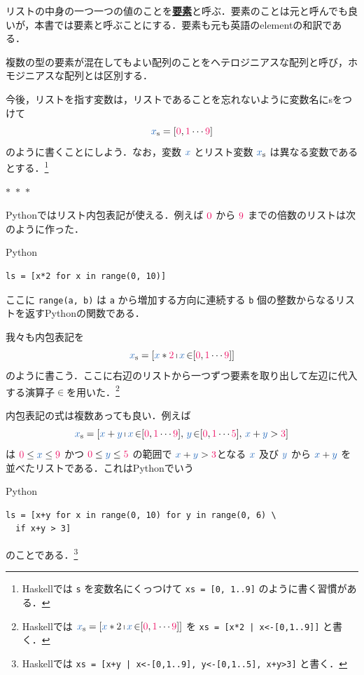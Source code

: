 \documentclass[a5paper,twoside,fleqn,draft]{jsbook}
\def\constantColor{WildStrawberry}
\def\varColor{NavyBlue}
\newcommand{\separator}{\begin{center}$*$~$*$~$*$\end{center}}
\newcommand{\programminglanguage}[1]{\textsf{#1}}
\newcommand{\haskell}{\programminglanguage{Haskell}}
\newcommand{\python}{\programminglanguage{Python}}
\newcommand{\keyword}[1]{{\underline{\textbf{#1}}}}
\newcommand{\code}[1]{\texttt{#1}}
\newenvironment{pythoncode}{\begin{itembox}[r]{\python}}{\end{itembox}}
\newcommand{\mConstant}[1]{\textcolor{\constantColor}{#1}}
\newcommand{\mZeroNumber}{{\mConstant{0}}}
\newcommand{\mOneNumber}{{\mConstant{1}}}
\newcommand{\mTwoNumber}{\mConstant{2}}
\newcommand{\mThreeNumber}{\mConstant{3}}
\newcommand{\mFiveNumber}{\mConstant{5}}
\newcommand{\mNineNumber}{\mConstant{9}}
\newcommand{\mVar}[1]{\textcolor{\varColor}{#1}}
\newcommand{\mXVar}{\mVar{x}}
\newcommand{\mYVar}{\mVar{y}}
\DeclareMathOperator{\mFrom}{\in}
\newcommand{\mList}[1]{\mVar{#1}_\mathrm{s}}
\DeclareMathOperator{\mListComp}{\shortmid}
\begin{document}
リストの中身の一つ一つの値のことを\keyword{要素}と呼ぶ．要素のことは元と呼んでも良いが，本書では要素と呼ぶことにする．要素も元も英語のelementの和訳である．

複数の型の要素が混在してもよい配列のことをヘテロジニアスな配列と呼び，ホモジニアスな配列とは区別する．

今後，リストを指す変数は，リストであることを忘れないように変数名にsをつけて
\begin{equation}
  \mList{x}
  =[\mZeroNumber,\mOneNumber\dotsb\mNineNumber]
\end{equation}
のように書くことにしよう．なお，変数 $\mXVar$ とリスト変数 $\mList{x}$ は異なる変数であるとする．\footnote{\haskell では \code{s} を変数名にくっつけて \code{xs = [0, 1..9]} のように書く習慣がある．}

\separator

\python ではリスト内包表記が使える．例えば $\mZeroNumber$ から $\mNineNumber$ までの倍数のリストは次のように作った．
\begin{pythoncode}
\begin{verbatim}
ls = [x*2 for x in range(0, 10)]
\end{verbatim}
\end{pythoncode}
ここに \code{range(a, b)} は \code{a} から増加する方向に連続する \code{b} 個の整数からなるリストを返す\python の関数である．

我々も内包表記を
\begin{equation}
  \mList{x}
  =[\mXVar*\mTwoNumber\mListComp\mXVar\mFrom[\mZeroNumber,\mOneNumber\dotsb\mNineNumber]]
\end{equation}
のように書こう．ここに右辺のリストから一つずつ要素を取り出して左辺に代入する演算子$\mFrom$を用いた．\footnote{\haskell では $\mList{x}=[\mXVar*2\mListComp\mXVar\mFrom[\mZeroNumber,\mOneNumber\dotsb\mNineNumber]]$ を \code{xs = [x*2 | x<-[0,1..9]]} と書く．}

内包表記の式は複数あっても良い．例えば
\begin{equation}
  \mList{x}
  =[\mXVar+\mYVar\mListComp\mXVar\mFrom[\mZeroNumber,\mOneNumber\dotsb\mNineNumber],\,\mYVar\mFrom[\mZeroNumber,\mOneNumber\dotsb\mFiveNumber],\,\mXVar+\mYVar>\mThreeNumber]
\end{equation}
は $\mZeroNumber\le\mXVar\le\mNineNumber$ かつ $\mZeroNumber\le\mYVar\le\mFiveNumber$ の範囲で $\mXVar+\mYVar>\mThreeNumber$となる $\mXVar$ 及び $\mYVar$ から $\mXVar+\mYVar$ を並べたリストである．これは\python でいう
\begin{pythoncode}
\begin{verbatim}
ls = [x+y for x in range(0, 10) for y in range(0, 6) \
  if x+y > 3]
\end{verbatim}
\end{pythoncode}
のことである．\footnote{\haskell では \code{xs = [x+y | x<-[\mZeroNumber,\mOneNumber..9], y<-[\mZeroNumber,\mOneNumber..5], x+y>\mThreeNumber]} と書く．}
\end{document}
